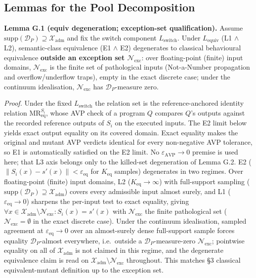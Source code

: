 \documentclass[manuscript,screen,review]{acmart}
\begin{document}
\subsection{Lemmas for the Pool Decomposition}\label{g.3-lemmas-three-state-decomposition-degenerates-under-l}

\textbf{Lemma G.1 (equiv degeneration; exception-set
qualification).} Assume
$\mathrm{supp}(\mathcal{D}_P) \supseteq \mathcal{X}_{\mathrm{adm}}$ and
fix the switch component $L_{\mathrm{switch}}$. Under
$L_{\mathrm{equiv}}$ (L1 $\wedge$ L2), semantic-class equivalence
(E1 $\wedge$ E2) degenerates to classical behavioural equivalence
\textbf{outside an exception set $\mathcal{N}_{\mathrm{exc}}$}: over
floating-point (finite) input domains, $\mathcal{N}_{\mathrm{exc}}$ is
the finite set of pathological inputs (Not-a-Number propagation and
overflow/underflow traps), empty in the exact discrete case; under the
continuum idealisation, $\mathcal{N}_{\mathrm{exc}}$ has
$\mathcal{D}_P$-measure zero.

\emph{Proof.} Under the fixed $L_{\mathrm{switch}}$ the relation set is
the reference-anchored identity relation
$\mathrm{MR}_{\mathrm{eq}}^{S_i}$, whose AVP check of a program $Q$
compares $Q$'s outputs against the recorded reference outputs of $S_i$
on the executed inputs. The E2 limit below yields exact output equality
on its covered domain. Exact equality makes the original and mutant AVP
verdicts identical for every non-negative AVP tolerance, so E1 is
automatically satisfied on the E2 limit. No
$\varepsilon_{\mathrm{AVP}}\to0$ premise is used here; that L3 axis
belongs only to the killed-set degeneration of Lemma G.2. E2
($\|S_i(x) - s'(x)\| < \varepsilon_{\mathrm{eq}}$ for $K_{\mathrm{eq}}$ samples)
degenerates in two regimes. Over floating-point (finite) input domains,
L2 ($K_{\mathrm{eq}} \to \infty$) with full-support sampling
($\mathrm{supp}(\mathcal{D}_P) \supseteq \mathcal{X}_{\mathrm{adm}}$)
covers every admissible input almost surely, and L1
($\varepsilon_{\mathrm{eq}} \to 0$) sharpens the per-input test to exact
equality, giving
$\forall x \in \mathcal{X}_{\mathrm{adm}} \setminus \mathcal{N}_{\mathrm{exc}}: S_i(x) = s'(x)$
with $\mathcal{N}_{\mathrm{exc}}$ the finite pathological set
($\mathcal{N}_{\mathrm{exc}} = \emptyset$ in the exact discrete case).
Under the continuum idealisation, sampled agreement at
$\varepsilon_{\mathrm{eq}} \to 0$ over an almost-surely dense
full-support sample forces equality $\mathcal{D}_P$-almost everywhere,
i.e.\ outside a $\mathcal{D}_P$-measure-zero
$\mathcal{N}_{\mathrm{exc}}$; pointwise equality on all of
$\mathcal{X}_{\mathrm{adm}}$ is not claimed in this regime, and the
degenerate equivalence claim is read on
$\mathcal{X}_{\mathrm{adm}} \setminus \mathcal{N}_{\mathrm{exc}}$
throughout. This matches \citet{d7c38286734419b52de4262c9802ebdfcf4b9447} §3 classical
equivalent-mutant definition up to the exception set.
\end{document}
